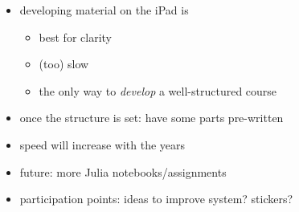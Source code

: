\documentclass[a4paper,12pt]{article}
\begin{document}
\begin{itemize}
  \item developing material on the iPad is 
  \begin{itemize}
    \item best for clarity
    \item (too) slow
    \item the only way to \emph{develop} a well-structured course
  \end{itemize}
  \item once the structure is set: have some parts pre-written
  \item speed will increase with the years
  \item future: more Julia notebooks/assignments
  \item participation points: ideas to improve system? stickers?
\end{itemize}






\end{document}

